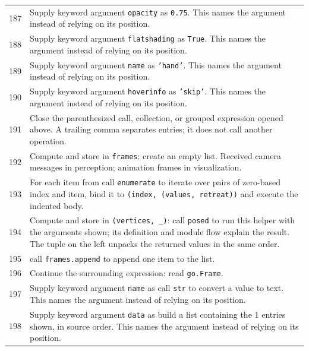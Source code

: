 \documentclass[11pt,a4paper]{book}
\begin{document}
\begin{longtable}{r p{}}
187 & Supply keyword argument \texttt{opacity} as \texttt{0.75}. This names the argument instead of relying on its position. \\

188 & Supply keyword argument \texttt{flatshading} as \texttt{True}. This names the argument instead of relying on its position. \\

189 & Supply keyword argument \texttt{name} as \texttt{'hand'}. This names the argument instead of relying on its position. \\

190 & Supply keyword argument \texttt{hoverinfo} as \texttt{'skip'}. This names the argument instead of relying on its position. \\

191 & Close the parenthesized call, collection, or grouped expression opened above. A trailing comma separates entries; it does not call another operation. \\

192 & Compute and store in \texttt{frames}: create an empty list. Received camera messages in perception; animation frames in visualization. \\

193 & For each item from call \texttt{enumerate} to iterate over pairs of zero-based index and item, bind it to \texttt{(index, (values, retreat))} and execute the indented body. \\

194 & Compute and store in \texttt{(vertices, \_)}: call \texttt{posed} to run this helper with the arguments shown; its definition and module flow explain the result. The tuple on the left unpacks the returned values in the same order. \\

195 & call \texttt{frames.append} to append one item to the list. \\

196 & Continue the surrounding expression: read \texttt{go.Frame}. \\

197 & Supply keyword argument \texttt{name} as call \texttt{str} to convert a value to text. This names the argument instead of relying on its position. \\

198 & Supply keyword argument \texttt{data} as build a list containing the 1 entries shown, in source order. This names the argument instead of relying on its position. \\


\end{longtable}
\end{document}
